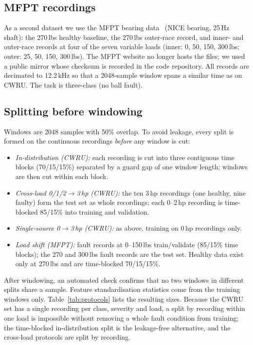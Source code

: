 \documentclass[conference]{IEEEtran}
\begin{document}
\subsection{MFPT recordings}
As a second dataset we use the MFPT bearing data~\cite{mfpt} (NICE bearing, 25\,Hz shaft):
the 270\,lbs healthy baseline, the 270\,lbs outer-race record, and inner- and
outer-race records at four of the seven variable loads (inner: 0, 50, 150,
300\,lbs; outer: 25, 50, 150, 300\,lbs). The MFPT website no longer hosts the
files; we used a public mirror whose checksum is recorded in the code
repository. All records are decimated to 12.2\,kHz so that a 2048-sample window
spans a similar time as on CWRU. The task is three-class (no ball fault).

\subsection{Splitting before windowing}
Windows are 2048 samples with 50\% overlap. To avoid leakage, every split is
formed on the continuous recordings \emph{before} any window is cut:
\begin{itemize}
\item \emph{In-distribution (CWRU):} each recording is cut into three
contiguous time blocks (70/15/15\%) separated by a guard gap of one window
length; windows are then cut within each block.
\item \emph{Cross-load 0/1/2$\to$3\,hp (CWRU):} the ten 3\,hp recordings
(one healthy, nine faulty) form the test set as whole recordings; each 0--2\,hp recording is time-blocked
85/15\% into training and validation.
\item \emph{Single-source 0$\to$3\,hp (CWRU):} as above, training on 0\,hp
recordings only.
\item \emph{Load shift (MFPT):} fault records at 0--150\,lbs train/validate
(85/15\% time blocks); the 270 and 300\,lbs fault records are the test set.
Healthy data exist only at 270\,lbs and are time-blocked 70/15/15\%.
\end{itemize}
After windowing, an automated check confirms that no two windows in different
splits share a sample. Feature standardisation statistics come from the
training windows only. Table~\ref{tab:protocols} lists the resulting sizes.
Because the CWRU set has a single recording per class, severity and load, a
split by recording within one load is impossible without removing a whole
fault condition from training; the time-blocked in-distribution split is the
leakage-free alternative, and the cross-load protocols are split by recording.
\end{document}
